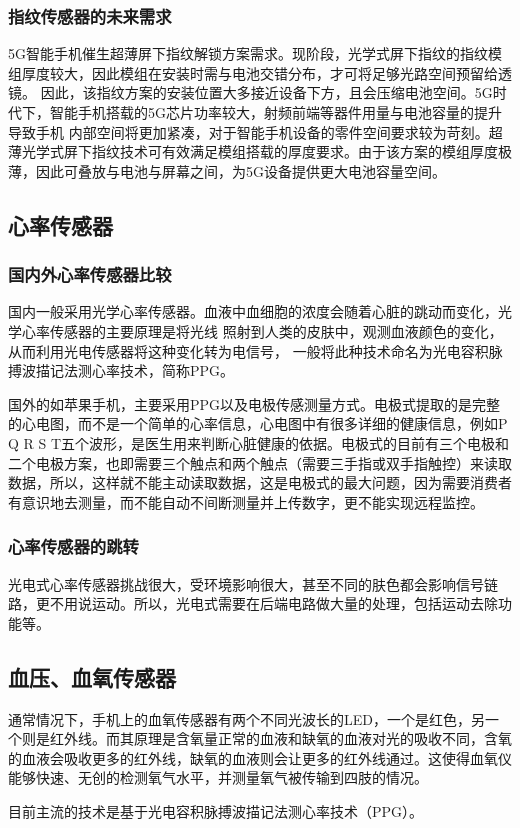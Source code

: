 \documentclass[lang=cn]{elegantpaper}
\begin{document}
\subsubsection{指纹传感器的未来需求}

5G智能手机催生超薄屏下指纹解锁方案需求。现阶段，光学式屏下指纹的指纹模组厚度较大，因此模组在安装时需与电池交错分布，才可将足够光路空间预留给透镜。 因此，该指纹方案的安装位置大多接近设备下方，且会压缩电池空间。5G时代下，智能手机搭载的5G芯片功率较大，射频前端等器件用量与电池容量的提升导致手机 内部空间将更加紧凑，对于智能手机设备的零件空间要求较为苛刻。超薄光学式屏下指纹技术可有效满足模组搭载的厚度要求。由于该方案的模组厚度极薄，因此可叠放与电池与屏幕之间，为5G设备提供更大电池容量空间。

\subsection{心率传感器}

\subsubsection{国内外心率传感器比较}

国内一般采用光学心率传感器。血液中血细胞的浓度会随着心脏的跳动而变化，光学心率传感器的主要原理是将光线 照射到人类的皮肤中，观测血液颜色的变化，从而利用光电传感器将这种变化转为电信号， 一般将此种技术命名为光电容积脉搏波描记法测心率技术，简称PPG。

国外的如苹果手机，主要采用PPG以及电极传感测量方式。电极式提取的是完整的心电图，而不是一个简单的心率信息，心电图中有很多详细的健康信息，例如P Q R S T五个波形，是医生用来判断心脏健康的依据。\cite{Heart}电极式的目前有三个电极和二个电极方案，也即需要三个触点和两个触点（需要三手指或双手指触控）来读取数据，所以，这样就不能主动读取数据，这是电极式的最大问题，因为需要消费者有意识地去测量，而不能自动不间断测量并上传数字，更不能实现远程监控。

\subsubsection{心率传感器的跳转}

光电式心率传感器挑战很大，受环境影响很大，甚至不同的肤色都会影响信号链路，更不用说运动。所以，光电式需要在后端电路做大量的处理，包括运动去除功能等。

\subsection{血压、血氧传感器}

通常情况下，手机上的血氧传感器有两个不同光波长的LED，一个是红色，另一个则是红外线。而其原理是含氧量正常的血液和缺氧的血液对光的吸收不同，含氧的血液会吸收更多的红外线，缺氧的血液则会让更多的红外线通过。这使得血氧仪能够快速、无创的检测氧气水平\cite{BloodO2}，并测量氧气被传输到四肢的情况。

目前主流的技术是基于光电容积脉搏波描记法测心率技术（PPG）。




% 

\end{document}
